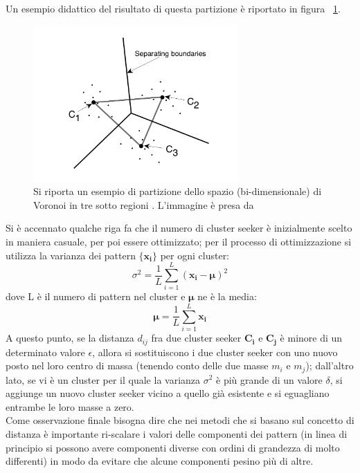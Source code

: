 Un esempio didattico del risultato di questa partizione è riportato in figura ~\ref{Voronoi}.
\begin{figure}[h!]
	\centering
	\includegraphics[width=0.70\textwidth]{figs/Voronoi.png}
	\caption{Si riporta un esempio di partizione dello spazio (bi-dimensionale) di Voronoi in tre sotto regioni . L'immagine è presa da \cite{IntroML}}
	\label{Voronoi}
\end{figure}

Si è accennato qualche riga fa che il numero di cluster seeker è inizialmente scelto in maniera casuale, per poi essere ottimizzato; per il processo di ottimizzazione si utilizza la varianza dei pattern $\{\textbf{x}_\textbf{i}\}$ per ogni cluster:
\begin{equation}
	\sigma^2 = \frac{1}{L}\sum_{i=1}^{L} (\textbf{x}_\textbf{i} - \bm{\mu})^2
\end{equation}
dove L è il numero di pattern nel cluster e $\bm{\mu}$ ne è la media:
\begin{equation}
	\bm{\mu} = \frac{1}{L}\sum_{i=1}^{L} \textbf{x}_\textbf{i}
\end{equation}
A questo punto, se la distanza $d_{ij}$ fra due cluster seeker $\textbf{C}_\textbf{i}$ e $\textbf{C}_\textbf{j}$ è minore di un determinato valore $\epsilon$, allora si sostituiscono i due cluster seeker con uno nuovo posto nel loro centro di massa (tenendo conto delle due masse $m_i$ e $m_j$); dall'altro lato, se vi è un cluster per il quale la varianza $\sigma^2$ è più grande di un valore $\delta$, si aggiunge un nuovo cluster seeker vicino a quello già esistente e si eguagliano entrambe le loro masse a zero.\\
Come osservazione finale bisogna dire che nei metodi che si basano sul concetto di distanza è importante ri-scalare i valori delle componenti dei pattern (in linea di principio si possono avere componenti diverse con ordini di grandezza di molto differenti) in modo da evitare che alcune componenti pesino più di altre. \\ 
\newpage